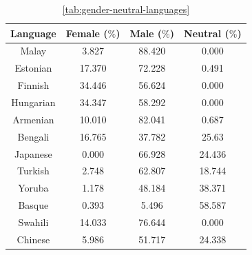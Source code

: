\documentclass[fleqn,10pt]{article}
\begin{document}
\begin{table}[H]
\small{
	\centering
	\begin{tabular}{|c|c|c|c|}
	\hline
	Language 	& Female ($\%$) 	& Male ($\%$)		& Neutral ($\%$)	\\ \hline
	\hline
	Malay & 3.827 & 88.420 & 0.000 \\ \hline
	Estonian & 17.370 & 72.228 & 0.491 \\ \hline
	Finnish & 34.446 & 56.624 & 0.000 \\ \hline
	Hungarian & 34.347 & 58.292 & 0.000 \\ \hline
	Armenian & 10.010 & 82.041 & 0.687 \\ \hline
	Bengali & 16.765 & 37.782 & 25.63 \\ \hline
	Japanese & 0.000 & 66.928 & 24.436 \\ \hline
	Turkish & 2.748 & 62.807 & 18.744 \\ \hline
	Yoruba & 1.178 & 48.184 & 38.371 \\ \hline
	Basque & 0.393 & 5.496 & 58.587 \\ \hline
	Swahili & 14.033 & 76.644 & 0.000 \\ \hline
	Chinese & 5.986 & 51.717 & 24.338 \\ \hline
	\end{tabular}
	\caption{ \ref{tab:gender-neutral-languages}}
	\label{tab:gender-by-language}
	}
\end{table}
\end{document}
